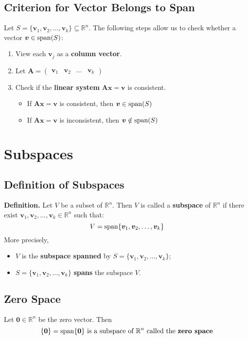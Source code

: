 \documentclass[../ma2001_notes.tex]{subfiles}
\begin{document}
\subsection{Criterion for Vector Belongs to Span}
Let \(S=\{\bm{v}_1,\bm{v}_2,\ldots,\bm{v}_k\}\subseteq\mathbb{R}^n\). The following steps allow us to check whether a vector \(\bm{v}\in\operatorname{span}(S)\):
\begin{enumerate}
	\item View each \(\bm{v}_j\) as a \textbf{column vector}.
	\item Let \(\bm{A}=\begin{pmatrix}
		\bm{v}_1 & \bm{v}_2 & \ldots & \bm{v}_k
	\end{pmatrix}\)
	\item Check if the \textbf{linear system} \(\bm{Ax}=\bm{v}\) is consistent.
	\begin{itemize}
		\item If \(\bm{Ax}=\bm{v}\) is consistent, then \(\bm{v}\in\operatorname{span}(S)\)
		\item If \(\bm{Ax}=\bm{v}\) is inconsistent, then \(\bm{v}\notin\operatorname{span}(S)\)
	\end{itemize}
\end{enumerate}

\section{Subspaces}
\subsection{Definition of Subspaces}
\textbf{Definition.} Let \(V\) be a subset of \(\mathbb{R}^n\). Then \(V\) is called a \textbf{subspace} of \(\mathbb{R}^n\) if there exist \(\bm{v}_1,\bm{v}_2,\ldots,\bm{v}_k\in\mathbb{R}^n\) such that:
\[V=\operatorname{span}\{\bm{v}_1,\bm{v}_2,\ldots,\bm{v}_k\}\]
More precisely,
\begin{itemize}
	\item\(V\) is the \textbf{subspace spanned} by \(S=\{\bm{v}_1,\bm{v}_2,\ldots,\bm{v}_k\}\);
	\item\(S=\{\bm{v}_1,\bm{v}_2,\ldots,\bm{v}_k\}\) \textbf{spans} the subspace \(V\).
\end{itemize}

\subsection{Zero Space}
Let \(\bm{0}\in\mathbb{R}^n\) be the zero vector. Then
\[\{\bm{0}\}=\operatorname{span}\{\bm{0}\}\text{ is a subspace of }\mathbb{R}^n\text{ called the }\textbf{zero space}\]
\end{document}
